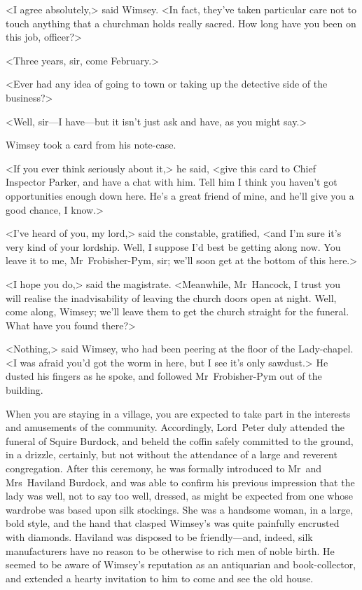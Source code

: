<I agree absolutely,> said Wimsey. <In fact, they've taken particular care not to touch anything that a churchman holds really sacred. How long have you been on this job, officer?>

<Three years, sir, come February.>

<Ever had any idea of going to town or taking up the detective side of the business?>

<Well, sir—I have—but it isn't just ask and have, as you might say.>

Wimsey took a card from his note-case.

<If you ever think seriously about it,> he said, <give this card to Chief Inspector Parker, and have a chat with him. Tell him I think you haven't got opportunities enough down here. He's a great friend of mine, and he'll give you a good chance, I know.>

<I've heard of you, my lord,> said the constable, gratified, <and I'm sure it's very kind of your lordship. Well, I suppose I'd best be getting along now. You leave it to me, Mr~Frobisher-Pym, sir; we'll soon get at the bottom of this here.>

<I hope you do,> said the magistrate. <Meanwhile, Mr~Hancock, I trust you will realise the inadvisability of leaving the church doors open at night. Well, come along, Wimsey; we'll leave them to get the church straight for the funeral. What have you found there?>

<Nothing,> said Wimsey, who had been peering at the floor of the Lady-chapel. <I was afraid you'd got the worm in here, but I see it's only sawdust.> He dusted his fingers as he spoke, and followed Mr~Frobisher-Pym out of the building.

\divider
When you are staying in a village, you are expected to take part in the interests and amusements of the community. Accordingly, Lord~Peter duly attended the funeral of Squire Burdock, and beheld the coffin safely committed to the ground, in a drizzle, certainly, but not without the attendance of a large and reverent congregation. After this ceremony, he was formally introduced to Mr~and Mrs~Haviland Burdock, and was able to confirm his previous impression that the lady was well, not to say too well, dressed, as might be expected from one whose wardrobe was based upon silk stockings. She was a handsome woman, in a large, bold style, and the hand that clasped Wimsey's was quite painfully encrusted with diamonds. Haviland was disposed to be friendly—and, indeed, silk manufacturers have no reason to be otherwise to rich men of noble birth. He seemed to be aware of Wimsey's reputation as an antiquarian and book-collector, and extended a hearty invitation to him to come and see the old house.

